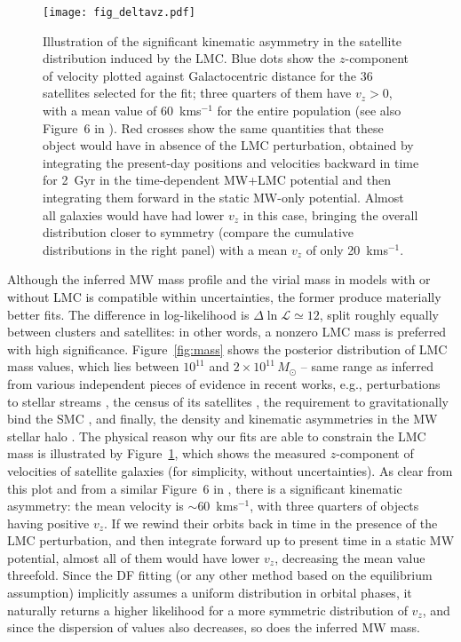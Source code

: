 \documentclass[usenatbib,fleqn]{mnras}
\newcommand{\kms}{km\:s$^{-1}$\xspace}
\begin{document}
\begin{figure}
\texttt{[image: fig\_deltavz.pdf]}
\caption{
Illustration of the significant kinematic asymmetry in the satellite distribution induced by the LMC. Blue dots show the $z$-component of velocity plotted against Galactocentric distance for the 36 satellites selected for the fit; three quarters of them have $v_z>0$, with a mean value of 60~\kms for the entire population (see also Figure~6 in \citealt{Erkal2020b}). Red crosses show the same quantities that these object would have in absence of the LMC perturbation, obtained by integrating the present-day positions and velocities backward in time for 2~Gyr in the time-dependent MW+LMC potential and then integrating them forward in the static MW-only potential. Almost all galaxies would have had lower $v_z$ in this case, bringing the overall distribution closer to symmetry (compare the cumulative distributions in the right panel) with a mean $v_z$ of only 20~\kms.
}  \label{fig:deltavz}
\end{figure}

Although the inferred MW mass profile and the virial mass in models with or without LMC is compatible within uncertainties, the former produce materially better fits. The difference in log-likelihood is $\Delta\ln\mathcal L\simeq 12$, split roughly equally between clusters and satellites: in other words, a nonzero LMC mass is preferred with high significance. Figure~\ref{fig:mass} shows the posterior distribution of LMC mass values, which lies between $10^{11}$ and $2\times10^{11}\,M_\odot$ -- same range as inferred from various independent pieces of evidence in recent works, e.g., perturbations to stellar streams \citep{Erkal2019,Vasiliev2021b,Shipp2021}, the census of its satellites \citep{Erkal2020a,Battaglia2021}, the requirement to gravitationally bind the SMC \citep{Kallivayalil2013}, and finally, the density and kinematic asymmetries in the MW stellar halo \citep{Erkal2021,Petersen2021,Conroy2021}. The physical reason why our fits are able to constrain the LMC mass is illustrated by Figure~\ref{fig:deltavz}, which shows the measured $z$-component of velocities of satellite galaxies (for simplicity, without uncertainties). As clear from this plot and from a similar Figure~6 in \citet{Erkal2020b}, there is a significant kinematic asymmetry: the mean velocity is $\sim 60$~\kms, with three quarters of objects having positive $v_z$. If we rewind their orbits back in time in the presence of the LMC perturbation, and then integrate forward up to present time in a static MW potential, almost all of them would have lower $v_z$, decreasing the mean value threefold. Since the DF fitting (or any other method based on the equilibrium assumption) implicitly assumes a uniform distribution in orbital phases, it naturally returns a higher likelihood for a more symmetric distribution of $v_z$, and since the dispersion of values also decreases, so does the inferred MW mass.
\end{document}
